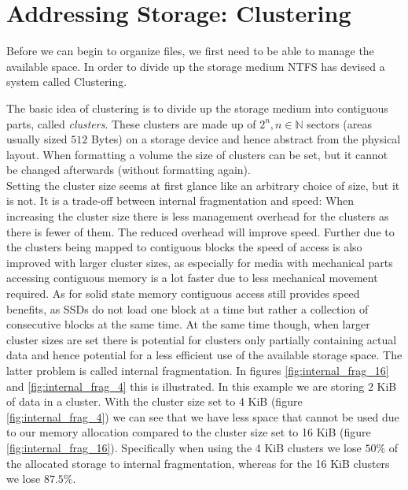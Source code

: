 \section{Addressing Storage: Clustering}
Before we can begin to organize files, we first need to be able to manage the available space. In order to divide up the storage medium NTFS has devised a system called Clustering.

The basic idea of clustering is to divide up the storage medium into contiguous parts, called \textit{clusters}. These clusters are made up of $2^n, n \in \mathbb{N}$\cite{microsoftinc:2018:DCS} sectors (areas usually sized $512$ Bytes) on a storage device and hence abstract from the physical layout. When formatting a volume the size of clusters can be set, but it cannot be changed afterwards (without formatting again).\\
Setting the cluster size seems at first glance like an arbitrary choice of size, but it is not. It is a trade-off between internal fragmentation and speed:
When increasing the cluster size there is less management overhead for the clusters as there is fewer of them. The reduced overhead will improve speed.\cite{RUSSINOVICH_ET_AL:2012:WI} Further due to the clusters being mapped to contiguous blocks the speed of access is also improved with larger cluster sizes, as especially for media with mechanical parts accessing contiguous memory is a lot faster due to less mechanical movement required. As for solid state memory contiguous access still provides speed benefits, as SSDs do not load one block at a time but rather a collection of consecutive blocks at the same time.\cite{BELLOSA:2017:OS}
At the same time though, when larger cluster sizes are set there is potential for clusters only partially containing actual data and hence potential for a less efficient use of the available storage space. The latter problem is called internal fragmentation.  
In figures \ref{fig:internal_frag_16} and \ref{fig:internal_frag_4} this is illustrated. In this example we are storing 2 KiB of data in a cluster. With the cluster size set to 4 KiB (figure \ref{fig:internal_frag_4}) we can see that we have less space that cannot be used due to our memory allocation compared to the cluster size set to 16 KiB (figure \ref{fig:internal_frag_16}). Specifically when using the 4 KiB clusters we lose $50\%$ of the allocated storage to internal fragmentation, whereas for the 16 KiB clusters we lose $87.5\%$.
